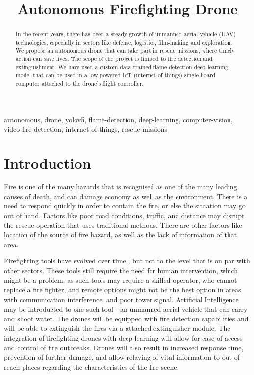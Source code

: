 \documentclass[conference]{IEEEtran}
\begin{document}
\title{Autonomous Firefighting Drone}

\author{
}

\maketitle

\begin{abstract}
In the recent years, there has been a steady growth of unmanned aerial vehicle (UAV) technologies, especially in sectors like defense, logistics, film-making and exploration.
We propose an autonomous drone that can take part in rescue missions, where timely action can save lives. The scope of the project is limited to fire detection and extinguishment. We have used a custom-data trained flame detection deep learning model that can be used in a low-powered IoT (internet of things) single-board computer attached to the drone's flight controller.
\end{abstract}

\begin{IEEEkeywords}
autonomous, drone, yolov5, flame-detection, deep-learning, computer-vision, video-fire-detection, internet-of-things, rescue-missions
\end{IEEEkeywords}

\section{Introduction}
Fire is one of the many hazards that is recognised as one of the many leading causes of death, and can damage economy as well as the environment\cite{b1, b2, b3, b4}. There is a need to respond quickly in order to contain the fire, or else the situation may go out of hand. Factors like poor road conditions, traffic, and distance may disrupt the rescue operation that uses traditional methods. There are other factors like location of the source of fire hazard, as well as the lack of information of that area.

Firefighting tools have evolved over time \cite{b5}, but not to the level that is on par with other sectors. These tools still require the need for human intervention, which might be a problem, as such tools may require a skilled operator, who cannot replace a fire fighter, and remote options might not be the best option in areas with communication interference, and poor tower signal. Artificial Intelligence may be introducted to one such tool - an unmanned aerial vehicle that can carry and shoot water. The drones will be equipped with fire detection capabilities and will be able to extinguish the fires via a attached extinguisher module.  The integration of firefighting drones with deep learning will allow for ease of access and control of fire outbreaks. Drones will also result in increased response time, prevention of further damage, and allow relaying of vital information to out of reach places regarding the characteristics of the fire scene.
\end{document}
